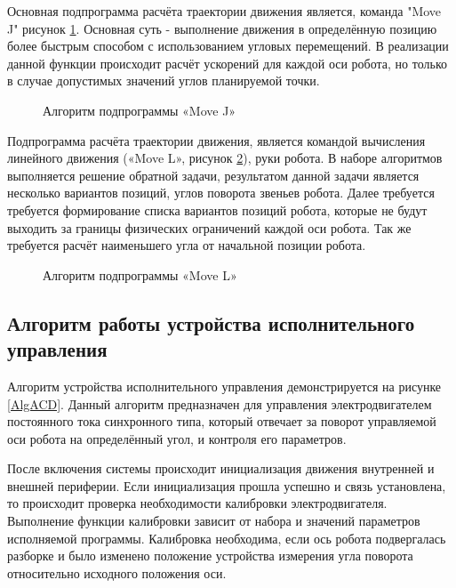 Основная подпрограмма расчёта траектории движения является, команда "Move J" рисунок \ref{AlgJ}. Основная суть - выполнение движения в определённую позицию более быстрым способом с использованием угловых перемещений. В реализации данной функции происходит расчёт ускорений для каждой оси робота, но только в случае допустимых значений углов планируемой точки. 

\begin{figure}[H]
	\centering
	
	\caption{Алгоритм подпрограммы «Move J»}
	\label{AlgJ}
\end{figure}

Подпрограмма расчёта траектории движения, является командой вычисления линейного движения («Move L», рисунок \ref{AlgL}), руки робота. В наборе алгоритмов выполняется решение обратной задачи, результатом данной задачи является несколько вариантов позиций, углов поворота звеньев робота. Далее требуется требуется формирование списка вариантов позиций робота, которые не будут выходить за границы физических ограничений каждой оси робота. Так же требуется расчёт наименьшего угла от начальной позиции робота.

\begin{figure}[H]
	\centering
	
	\caption{Алгоритм подпрограммы «Move L»}
	\label{AlgL}
\end{figure}

\subsection{Алгоритм работы устройства исполнительного управления}
Алгоритм устройства исполнительного управления демонстрируется на рисунке \ref{AlgACD}. Данный алгоритм предназначен для управления электродвигателем постоянного тока синхронного типа, который отвечает за поворот управляемой оси робота на определённый угол, и контроля его параметров. 

После включения системы происходит инициализация движения внутренней и внешней периферии. Если инициализация прошла успешно и связь установлена, то происходит проверка необходимости калибровки электродвигателя. Выполнение функции калибровки зависит от набора и значений параметров исполняемой программы. Калибровка необходима, если ось робота подвергалась разборке и было изменено положение устройства измерения угла поворота относительно исходного положения оси.

